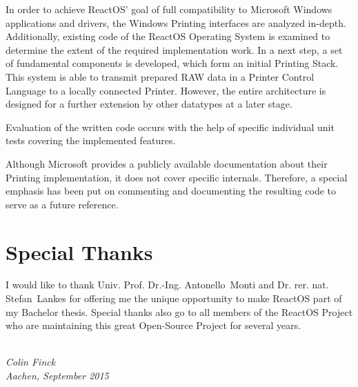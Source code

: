 In order to achieve ReactOS' goal of full compatibility to Microsoft Windows applications and drivers, the Windows Printing interfaces are analyzed in-depth.
Additionally, existing code of the ReactOS Operating System is examined to determine the extent of the required implementation work.
In a next step, a set of fundamental components is developed, which form an initial Printing Stack.
This system is able to transmit prepared RAW data in a Printer Control Language to a locally connected Printer.
However, the entire architecture is designed for a further extension by other datatypes at a later stage.

Evaluation of the written code occurs with the help of specific individual unit tests covering the implemented features.

Although Microsoft provides a publicly available documentation about their Printing implementation, it does not cover specific internals.
Therefore, a special emphasis has been put on commenting and documenting the resulting code to serve as a future reference.


\section{Special Thanks}
I would like to thank Univ. Prof. Dr.-Ing. Antonello~Monti and Dr. rer. nat. Stefan~Lankes for offering me the unique opportunity to make ReactOS part of my Bachelor thesis.
Special thanks also go to all members of the ReactOS Project who are maintaining this great Open-Source Project for several years.

\bigskip

\textit{\\
Colin Finck\\
Aachen, September 2015
}
